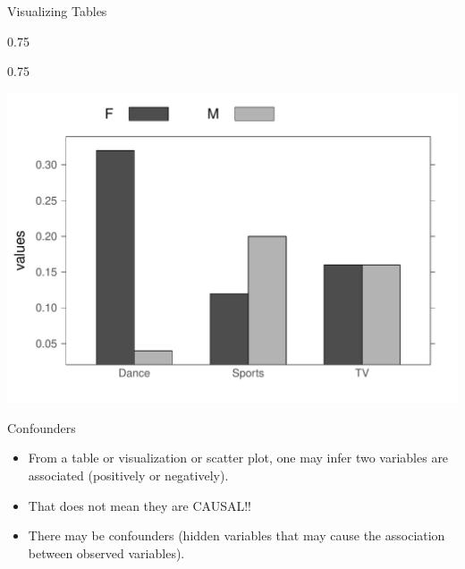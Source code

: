 \documentclass{beamer}\usepackage[]{graphicx}\usepackage[]{color}
\newenvironment{knitrout}{}{} %
\renewenvironment{knitrout}{\begin{spacing}{0.75}\begin{tiny}}{\end{tiny}\end{spacing}}
\begin{document}
\begin{frame}{Visualizing Tables}
\begin{knitrout}
\end{knitrout}

\newpage

\begin{knitrout}\small
{}\color{fgcolor}

{\centering \includegraphics[width=0.99\linewidth]{figure/graphics-unnamed-chunk-2-1} 

}



\end{knitrout}

\end{frame}

\begin{frame}{Confounders}

\begin{itemize}

\item From a table or visualization or scatter plot, one may infer two variables are 
associated (positively or negatively).

\item That does not mean they are CAUSAL!!

\item There may be confounders (hidden variables that may cause the association 
between observed variables).

\end{itemize}

\end{frame}
\end{document}

